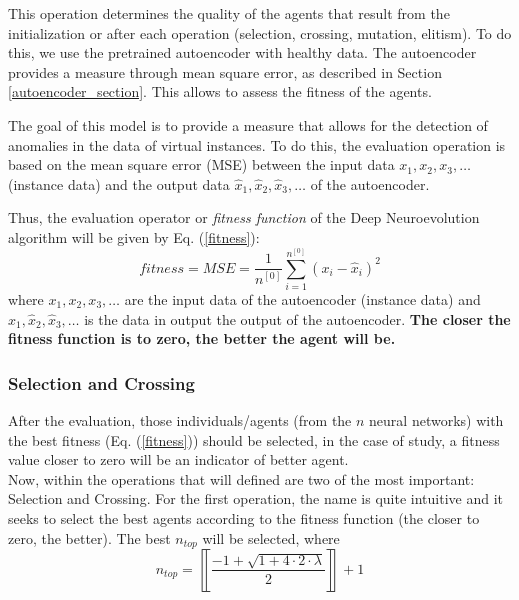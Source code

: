 \documentclass{iosart2c}
\begin{document}
This operation determines the quality of the agents that result from the initialization or after each operation (selection, crossing, mutation, elitism). To do this, we use the pretrained autoencoder with healthy data. The autoencoder provides a measure through mean square error, as described in Section \ref{autoencoder_section}. This allows to assess the fitness of the agents.

The goal of this model is to provide a measure that allows for the detection of anomalies in the data of virtual instances. To do this, the evaluation operation is based on the mean square error (MSE) between the input data ${x_1,x_2,x_3,\ldots}$ (instance data) and the output data ${\hat{x}_1,\hat{x}_2,\hat{x}_3,\ldots}$ of the autoencoder.

Thus, the evaluation operator or \textit{fitness function} of the Deep Neuroevolution algorithm will be given by Eq. (\ref{fitness}):
\begin{equation}\label{fitness}
    fitness=MSE=\frac{1}{n^{[0]}}\sum_{i=1}^{n^{[0]}} (x_i-\hat{x}_i)^2
\end{equation}
where ${x_1,x_2,x_3,\ldots}$ are the input data of the autoencoder (instance data) and ${\hat{x}_1,\hat{x}_2,\hat{x}_3,\ldots}$ is the data in output the output of the autoencoder. \textbf{The closer the fitness function is to zero, the better the agent will be.} \\



\subsubsection{Selection and Crossing}

After the evaluation, those individuals/agents (from the $n$ neural networks) with the best fitness (Eq. (\ref{fitness})) should be selected, in the case of study, a fitness value closer to zero will be an indicator of better agent. \\

Now, within the operations that will defined are two of the most important: Selection and Crossing. For the first operation, the name is quite intuitive and it seeks to select the best agents according to the fitness function (the closer to zero, the better). The best $n_{top}$ will be selected, where
\begin{equation}\label{n_top}
    n_{top}=\left\llbracket\frac{-1+\sqrt{1+4\cdot2\cdot \lambda}}{2}\right\rrbracket+1
\end{equation}
\end{document}
